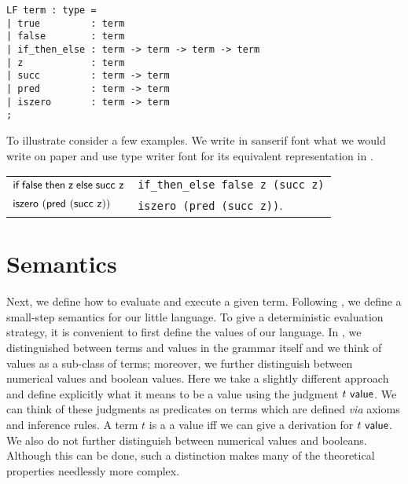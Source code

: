 \begin{lstlisting}
LF term : type =
| true         : term
| false        : term
| if_then_else : term -> term -> term -> term
| z            : term
| succ         : term -> term
| pred         : term -> term
| iszero       : term -> term
;
\end{lstlisting}

To illustrate consider a few examples. We write in sanserif font what
we would write on paper and use type writer font for its equivalent
representation in \beluga.

\begin{center}
\begin{tabular}{l@{\quad is represented as \quad}l}
$\textsf{if\;} \textsf{false} \textsf{\;then\;} \textsf{z} \textsf{\;else\;} \textsf{succ}~\textsf{z}$ &
\lstinline!if_then_else false z (succ z)!\\
$\textsf{iszero}~(\textsf{pred}~(\textsf{succ}~\textsf{z}))$ & \lstinline!iszero (pred (succ z))!.
\end{tabular}  
\end{center}


\section{Semantics}
Next, we define how to evaluate and execute a given term. Following
\cite{TAPL}, we define  a small-step semantics  for our  little language. To give  a  deterministic evaluation
strategy,  it is convenient to first define the values of our language.  In
\cite{TAPL}, we distinguished between terms and values in the grammar itself and
we think of values  as a sub-class of terms; moreover, we further
distinguish between numerical values and boolean values. Here we take  a slightly different
approach and define explicitly  what it means  to be a value using the judgment
$t ~\mathsf{value}$.  We can think of these judgments  as predicates on
terms which are defined  {\em via}  axioms and inference rules.  A term $t$ is a
a value iff we can give a derivation for $t ~\mathsf{value}$. We also do not further
distinguish between numerical values and  booleans. Although this can
be done, such a distinction makes many of the theoretical properties
needlessly more complex.



